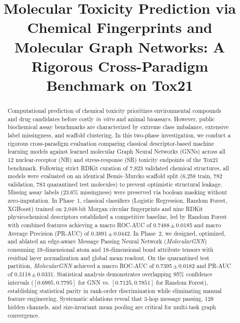 \documentclass[conference]{IEEEtran}
\newcommand{\pmsem}[2]{#1\,$\pm$\,#2}
\begin{document}
\title{Molecular Toxicity Prediction via Chemical Fingerprints and Molecular Graph Networks: A Rigorous Cross-Paradigm Benchmark on Tox21}

\author{
}

\maketitle

\begin{abstract}
Computational prediction of chemical toxicity prioritizes environmental compounds and drug candidates before costly \textit{in vitro} and animal bioassays. However, public biochemical assay benchmarks are characterized by extreme class imbalance, extensive label missingness, and scaffold clustering. In this two-phase investigation, we conduct a rigorous cross-paradigm evaluation comparing classical descriptor-based machine learning models against learned molecular Graph Neural Networks (GNNs) across all 12 nuclear-receptor (NR) and stress-response (SR) toxicity endpoints of the Tox21 benchmark. Following strict RDKit curation of 7,823 validated chemical structures, all models were evaluated on an identical Bemis--Murcko scaffold split (6,258 train, 782 validation, 783 quarantined test molecules) to prevent optimistic structural leakage. Missing assay labels (23.6\% missingness) were preserved via boolean masking without zero-imputation. In Phase~1, classical classifiers (Logistic Regression, Random Forest, XGBoost) trained on 2,048-bit Morgan circular fingerprints and nine RDKit physicochemical descriptors established a competitive baseline, led by Random Forest with combined features achieving a macro ROC-AUC of \pmsem{0.7488}{0.0185} and macro Average Precision (PR-AUC) of \pmsem{0.3891}{0.0442}. In Phase~2, we designed, optimized, and ablated an edge-aware Message Passing Neural Network (\textit{MolecularGNN}) consuming 19-dimensional atom and 18-dimensional bond attribute tensors with residual layer normalization and global mean readout. On the quarantined test partition, \textit{MolecularGNN} achieved a macro ROC-AUC of \pmsem{0.7395}{0.0182} and PR-AUC of \pmsem{0.3118}{0.0331}. Statistical analysis demonstrates overlapping 95\% confidence intervals ($[0.6995, 0.7795]$ for GNN vs. $[0.7125, 0.7851]$ for Random Forest), establishing statistical parity in rank-order discrimination while eliminating manual feature engineering. Systematic ablations reveal that 3-hop message passing, 128 hidden channels, and size-invariant mean pooling are critical for multi-task graph convergence.
\end{abstract}
\end{document}
